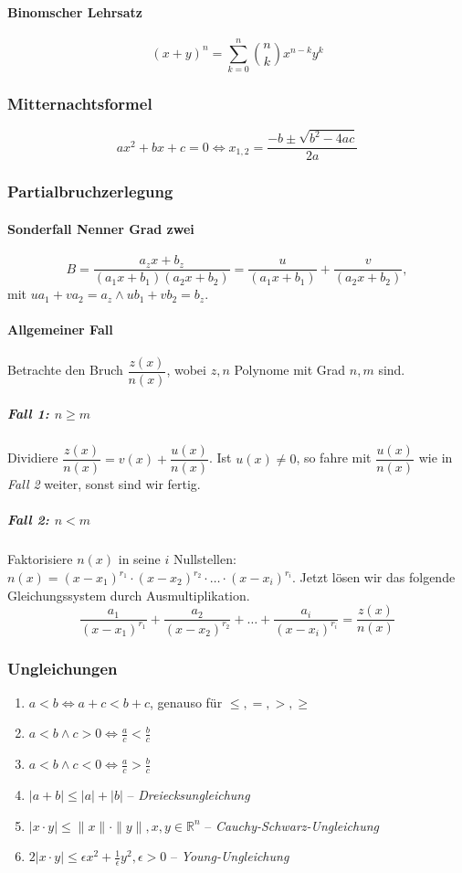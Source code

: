 \documentclass[a4paper, 9pt, DIV=24]{scrartcl}
\begin{document}
\paragraph*{Binomscher Lehrsatz}
$$\left(x+y\right)^n=\sum_{k=0}^{n} \binom{n}{k} x^{n-k}y^k$$

\subsubsection{Mitternachtsformel}
\[ ax^2 + bx + c = 0 \iff x_{1,2} = \frac{-b \pm \sqrt{b^2 - 4ac}}{2a} \]

\subsubsection{Partialbruchzerlegung}
\paragraph{Sonderfall Nenner Grad zwei}
\[
 B = \dfrac{a_zx+b_z}{(a_1x+b_1)(a_2x+b_2)} = \dfrac{u}{(a_1x+b_1)} + \dfrac{v}{(a_2x+b_2)},
\]
mit $ua_1 + va_2 = a_z \wedge ub_1 + vb_2 = b_z$.
\paragraph{Allgemeiner Fall}
Betrachte den Bruch $\dfrac{z(x)}{n(x)}$, wobei $z,n$ Polynome mit Grad $n,m$ sind.
\subparagraph{Fall 1: $n \geq m$}
Dividiere $\dfrac{z(x)}{n(x)} = v(x) + \dfrac{u(x)}{n(x)}$.
Ist $u(x) \neq 0$, so fahre mit $\dfrac{u(x)}{n(x)}$ wie in \emph{Fall 2} weiter, sonst sind wir fertig.
\subparagraph{Fall 2: $n < m$}
Faktorisiere $n(x)$ in seine $i$ Nullstellen: $n(x) = (x-x_1)^{r_1} \cdot (x-x_2)^{r_2} \cdot \dots \cdot (x-x_i)^{r_i}.$
Jetzt lösen wir das folgende Gleichungssystem durch Ausmultiplikation.
\[ \frac{a_1}{(x-x_1)^{r_1}} + \frac{a_2}{(x-x_2)^{r_2}} + \dots + \frac{a_i}{(x-x_i)^{r_i}} = \frac{z(x)}{n(x)} \]

\subsubsection{Ungleichungen}
\begin{enumerate}[label={(}\arabic*{)}]
 \item $a < b \iff a + c < b + c$, genauso für $\leq,=,>,\geq$
 \item $a < b \wedge c > 0 \iff \frac{a}{c} < \frac{b}{c}$
 \item $a < b \wedge c < 0 \iff \frac{a}{c} > \frac{b}{c}$
 \item $|a+b| \leq |a| + |b|$ -- \emph{Dreiecksungleichung}
 \item $|x\cdot y| \leq \|x\|\cdot\|y\|, x,y \in \mathbb{R}^n$ -- \emph{Cauchy-Schwarz-Ungleichung}
 \item $2|x\cdot y| \leq \epsilon x^2 + \frac{1}{\epsilon}y^2, \epsilon > 0$ -- \emph{Young-Ungleichung}
\end{enumerate}
\end{document}
